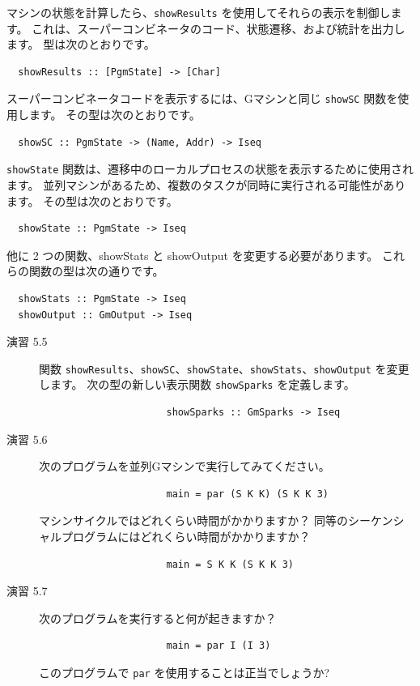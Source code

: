 \documentclass{jbook}
\begin{document}
マシンの状態を計算したら、\texttt{showResults} を使用してそれらの表示を制御します。
これは、スーパーコンビネータのコード、状態遷移、および統計を出力します。
型は次のとおりです。

\begin{verbatim}
  showResults :: [PgmState] -> [Char]
\end{verbatim}
\newpage

スーパーコンビネータコードを表示するには、Gマシンと同じ \texttt{showSC} 関数を使用します。
その型は次のとおりです。

\begin{verbatim}
  showSC :: PgmState -> (Name, Addr) -> Iseq
\end{verbatim}

\texttt{showState} 関数は、遷移中のローカルプロセスの状態を表示するために使用されます。
並列マシンがあるため、複数のタスクが同時に実行される可能性があります。
その型は次のとおりです。

\begin{verbatim}
  showState :: PgmState -> Iseq
\end{verbatim}

他に 2 つの関数、showStats と showOutput を変更する必要があります。
これらの関数の型は次の通りです。

\begin{verbatim}
  showStats :: PgmState -> Iseq
  showOutput :: GmOutput -> Iseq
\end{verbatim}

\begin{description}
	\item[演習 5.5] 関数 \texttt{showResults}、\texttt{showSC}、\texttt{showState}、\texttt{showStats}、\texttt{showOutput} を変更します。
		次の型の新しい表示関数 \texttt{showSparks} を定義します。
		\begin{verbatim}
					  showSparks :: GmSparks -> Iseq
					\end{verbatim}
	\item[演習 5.6] 次のプログラムを並列Gマシンで実行してみてください。
		\begin{verbatim}
					  main = par (S K K) (S K K 3)
                    \end{verbatim}
		マシンサイクルではどれくらい時間がかかりますか？
		同等のシーケンシャルプログラムにはどれくらい時間がかかりますか？
		\begin{verbatim}
					  main = S K K (S K K 3)
					\end{verbatim}
	\item[演習 5.7] 次のプログラムを実行すると何が起きますか？
		\begin{verbatim}
					  main = par I (I 3)
                    \end{verbatim}
		このプログラムで \texttt{par} を使用することは正当でしょうか?
\end{description}
\end{document}
